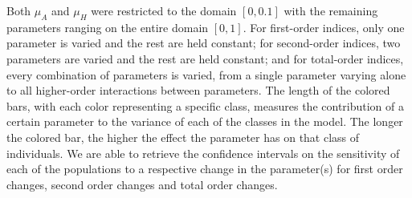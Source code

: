 \documentclass[12pt]{article}
\begin{document}
Both $\mu_{A}$ and $\mu_{H}$ were restricted to the domain $[0,0.1]$ with the remaining parameters ranging on the entire domain $[0,1]$. For first-order indices, only one parameter is varied and the rest are held constant; for second-order indices, two parameters are varied and the rest are held constant; and for total-order indices, every combination of parameters is varied, from a single parameter varying alone to all higher-order interactions between parameters. The length of the colored bars, with each color representing a specific class, measures the contribution of a certain parameter to the variance of each of the classes in the model. The longer the colored bar, the higher the effect the parameter has on that class of individuals. We are able to retrieve the confidence intervals on the sensitivity of each of the populations to a respective change in the parameter(s) for first order changes, second order changes and total order changes. \\







\pagebreak


\end{document}
